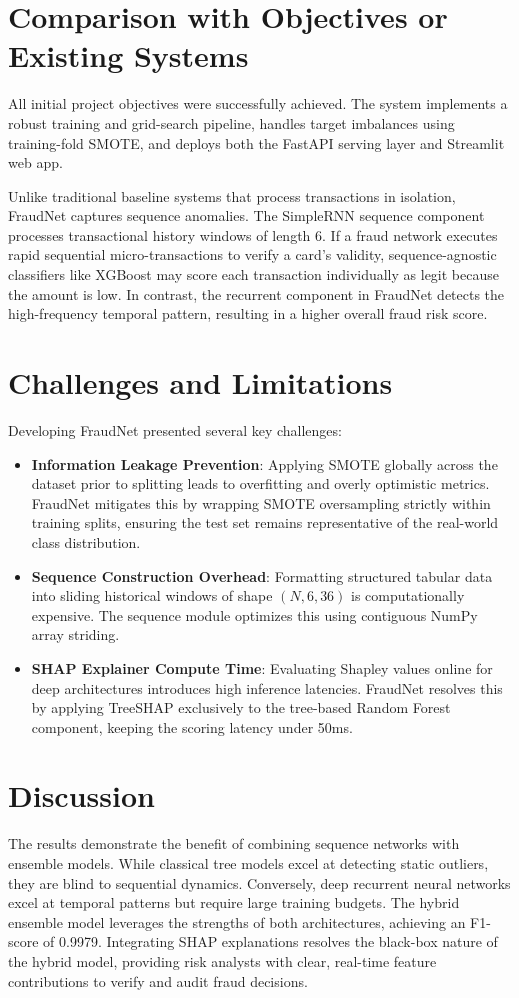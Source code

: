 \section{Comparison with Objectives or Existing Systems}

All initial project objectives were successfully achieved. The system implements a robust training and grid-search pipeline, handles target imbalances using training-fold SMOTE, and deploys both the FastAPI serving layer and Streamlit web app.

Unlike traditional baseline systems that process transactions in isolation, FraudNet captures sequence anomalies. The SimpleRNN sequence component processes transactional history windows of length 6. If a fraud network executes rapid sequential micro-transactions to verify a card's validity, sequence-agnostic classifiers like XGBoost may score each transaction individually as legit because the amount is low. In contrast, the recurrent component in FraudNet detects the high-frequency temporal pattern, resulting in a higher overall fraud risk score.

\section{Challenges and Limitations}

Developing FraudNet presented several key challenges:
\begin{itemize}
    \item \textbf{Information Leakage Prevention}: Applying SMOTE globally across the dataset prior to splitting leads to overfitting and overly optimistic metrics. FraudNet mitigates this by wrapping SMOTE oversampling strictly within training splits, ensuring the test set remains representative of the real-world class distribution.
    \item \textbf{Sequence Construction Overhead}: Formatting structured tabular data into sliding historical windows of shape $(N, 6, 36)$ is computationally expensive. The sequence module optimizes this using contiguous NumPy array striding.
    \item \textbf{SHAP Explainer Compute Time}: Evaluating Shapley values online for deep architectures introduces high inference latencies. FraudNet resolves this by applying TreeSHAP exclusively to the tree-based Random Forest component, keeping the scoring latency under 50ms.
\end{itemize}

\section{Discussion}

The results demonstrate the benefit of combining sequence networks with ensemble models. While classical tree models excel at detecting static outliers, they are blind to sequential dynamics. Conversely, deep recurrent neural networks excel at temporal patterns but require large training budgets. The hybrid ensemble model leverages the strengths of both architectures, achieving an F1-score of 0.9979. Integrating SHAP explanations resolves the black-box nature of the hybrid model, providing risk analysts with clear, real-time feature contributions to verify and audit fraud decisions.
